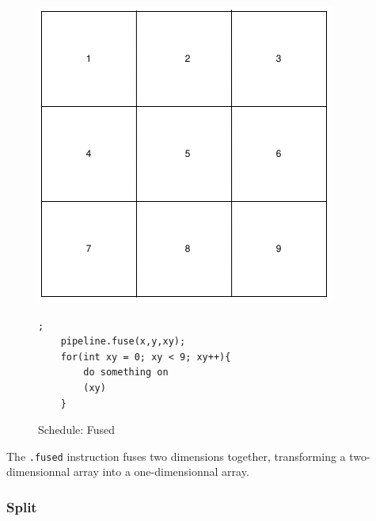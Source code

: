 \begin{figure}[H]

		\begin{minipage}[c]{\EIW}
			\centering
		\includegraphics[width=\textwidth]{Images/BaseOrder.png}
		\end{minipage}
		\begin{minipage}[c]{\ECW}
			\centering
\begin{lstlisting}[label={code:reorder}];
    pipeline.fuse(x,y,xy);
	for(int xy = 0; xy < 9; xy++){
		do something on
		(xy)
	}
\end{lstlisting}
		\end{minipage}
		\caption{Schedule: Fused}
		\label{schedule:fuse}
\end{figure}

	The \verb|.fused| instruction fuses two dimensions together, transforming a two-dimensionnal array into a one-dimensionnal array. 


\subsubsection{Split}


